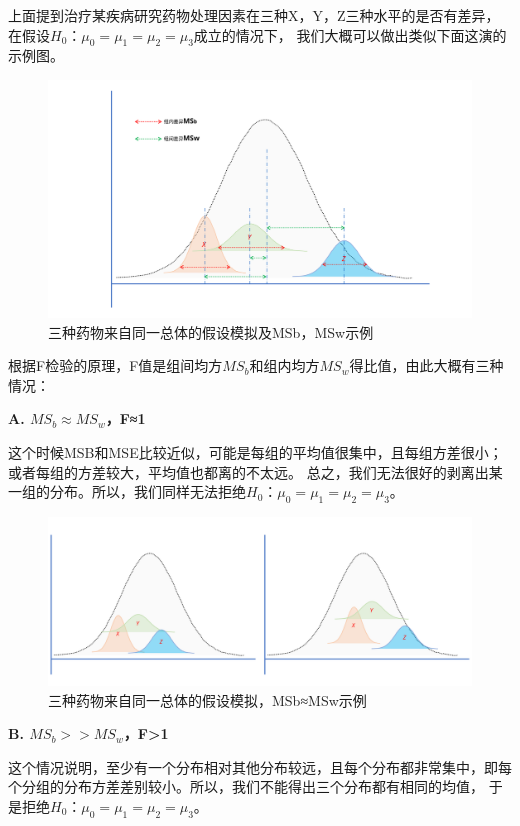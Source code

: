 \documentclass[
]{article}
\begin{document}
上面提到治疗某疾病研究药物处理因素在三种X，Y，Z三种水平的是否有差异，在假设\(H_0：μ_0=μ_1=μ_2=μ_3\)成立的情况下，
我们大概可以做出类似下面这演的示例图。

\begin{figure}

{\centering \includegraphics[width=0.7\linewidth]{image/xyzAnovaFig} 

}

\caption{三种药物来自同一总体的假设模拟及MSb，MSw示例}\label{fig:xyzanova1}
\end{figure}

根据F检验的原理，F值是组间均方\(MS_b\)和组内均方\(MS_w\)得比值，由此大概有三种情况：

\textbf{A. \(MS_b≈MS_w\)，F≈1}

这个时候MSB和MSE比较近似，可能是每组的平均值很集中，且每组方差很小；或者每组的方差较大，平均值也都离的不太远。
总之，我们无法很好的剥离出某一组的分布。所以，我们同样无法拒绝\(H_0：μ_0=μ_1=μ_2=μ_3\)。

\begin{figure}

{\centering \includegraphics[width=0.7\linewidth]{image/MSbeqMSw} 

}

\caption{三种药物来自同一总体的假设模拟，MSb≈MSw示例}\label{fig:xyzanova2}
\end{figure}

\textbf{B. \(MS_b>>MS_w\)，F\textgreater1}

这个情况说明，至少有一个分布相对其他分布较远，且每个分布都非常集中，即每个分组的分布方差差别较小。所以，我们不能得出三个分布都有相同的均值，
于是拒绝\(H_0：μ_0=μ_1=μ_2=μ_3\)。
\end{document}
